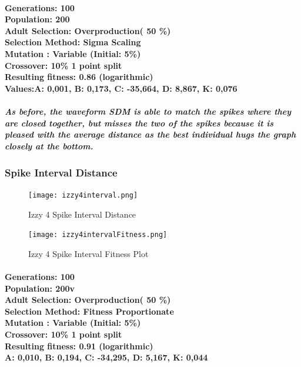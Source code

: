 \documentclass[titlepage,norsk]{article}
\begin{document}
\paragraph{
Generations: 100\\
Population: 200\\
Adult Selection: Overproduction( 50 \%)\\
Selection Method: Sigma Scaling \\
Mutation : Variable (Initial: 5\%)\\
Crossover: 10\% 1 point split \\
Resulting fitness: 0.86 (logarithmic) \\
Values:A: 0,001, B: 0,173, C: -35,664, D: 8,867, K: 0,076 \\
}

\subparagraph{As before, the waveform SDM is able to match the spikes where they are closed together, but misses the two of the spikes because it is pleased with the average distance as the best individual hugs the graph closely at the bottom.}

\subsubsection{Spike Interval Distance}

\begin{figure}[h!]
\centering
\texttt{[image: izzy4interval.png]}
\caption{Izzy 4 Spike Interval Distance}
\label{fig:awesome_image}
\end{figure}

\begin{figure}[h!]
\centering
\texttt{[image: izzy4intervalFitness.png]}
\caption{Izzy 4 Spike Interval Fitness Plot}
\label{fig:awesome_image}
\end{figure}

\paragraph{
Generations: 100\\
Population: 200v\\
Adult Selection: Overproduction( 50 \%)\\
Selection Method: Fitness Proportionate \\
Mutation : Variable (Initial: 5\%)\\
Crossover: 10\% 1 point split \\
Resulting fitness: 0.91 (logarithmic) \\
A: 0,010, B: 0,194, C: -34,295, D: 5,167, K: 0,044 \\
}
\end{document}
